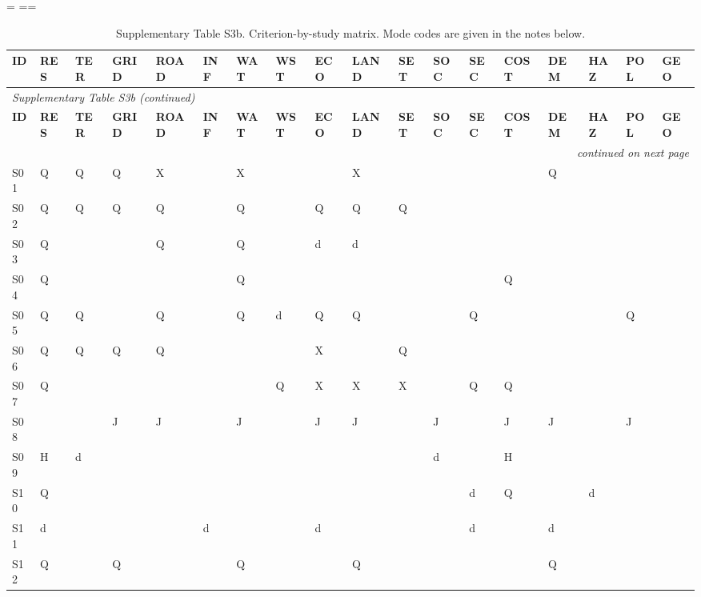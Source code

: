 \documentclass[11pt,a4paper]{article}
\newcommand{\genisle}{%
  \setlength{\textwidth}{25.3cm}\hsize=\textwidth
  \linewidth=\textwidth \columnwidth=\textwidth
  \setlength{\LTcapwidth}{\textwidth}}
\begin{document}
\begin{landscape}\genisle

{\scriptsize
\begin{longtable}{l>{\raggedright\arraybackslash}p{2.82cm}llllllllllllllll}
\caption{Supplementary Table S3b. Criterion-by-study matrix. Mode codes are given in the notes below.}\label{tab:s3b}\\
\toprule
\textbf{ID} & \textbf{RES} & \textbf{TER} & \textbf{GRID} & \textbf{ROAD} & \textbf{INF} & \textbf{WAT} & \textbf{WST} & \textbf{ECO} & \textbf{LAND} & \textbf{SET} & \textbf{SOC} & \textbf{SEC} & \textbf{COST} & \textbf{DEM} & \textbf{HAZ} & \textbf{POL} & \textbf{GEO} \\
\midrule
\endfirsthead
\multicolumn{18}{l}{\footnotesize\itshape Supplementary Table S3b (continued)}\\
\toprule
\textbf{ID} & \textbf{RES} & \textbf{TER} & \textbf{GRID} & \textbf{ROAD} & \textbf{INF} & \textbf{WAT} & \textbf{WST} & \textbf{ECO} & \textbf{LAND} & \textbf{SET} & \textbf{SOC} & \textbf{SEC} & \textbf{COST} & \textbf{DEM} & \textbf{HAZ} & \textbf{POL} & \textbf{GEO} \\
\midrule
\endhead
\midrule\multicolumn{18}{r}{\footnotesize\itshape continued on next page}\\
\endfoot
\bottomrule
\endlastfoot
S01 & Q & Q & Q & X &  & X &  &  & X &  &  &  &  & Q &  &  &  \\
S02 & Q & Q & Q & Q &  & Q &  & Q & Q & Q &  &  &  &  &  &  &  \\
S03 & Q &  &  & Q &  & Q &  & d & d &  &  &  &  &  &  &  &  \\
S04 & Q &  &  &  &  & Q &  &  &  &  &  &  & Q &  &  &  &  \\
S05 & Q & Q &  & Q &  & Q & d & Q & Q &  &  & Q &  &  &  & Q &  \\
S06 & Q & Q & Q & Q &  &  &  & X &  & Q &  &  &  &  &  &  &  \\
S07 & Q &  &  &  &  &  & Q & X & X & X &  & Q & Q &  &  &  &  \\
S08 &  &  & J & J &  & J &  & J & J &  & J &  & J & J &  & J &  \\
S09 & H & d &  &  &  &  &  &  &  &  & d &  & H &  &  &  &  \\
S10 & Q &  &  &  &  &  &  &  &  &  &  & d & Q &  & d &  &  \\
S11 & d &  &  &  & d &  &  & d &  &  &  & d &  & d &  &  &  \\
S12 & Q &  & Q &  &  & Q &  &  & Q &  &  &  &  & Q &  &  &  \\

\end{longtable}}
\end{landscape}
\end{document}
